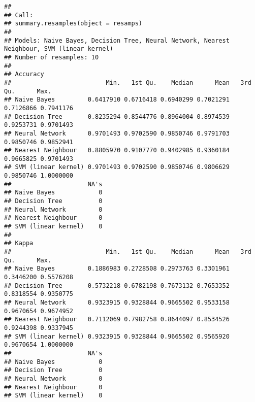 \documentclass[]{article}
\begin{document}
\begin{verbatim}
## 
## Call:
## summary.resamples(object = resamps)
## 
## Models: Naive Bayes, Decision Tree, Neural Network, Nearest Neighbour, SVM (linear kernel) 
## Number of resamples: 10 
## 
## Accuracy 
##                          Min.   1st Qu.    Median      Mean   3rd Qu.      Max.
## Naive Bayes         0.6417910 0.6716418 0.6940299 0.7021291 0.7126866 0.7941176
## Decision Tree       0.8235294 0.8544776 0.8964004 0.8974539 0.9253731 0.9701493
## Neural Network      0.9701493 0.9702590 0.9850746 0.9791703 0.9850746 0.9852941
## Nearest Neighbour   0.8805970 0.9107770 0.9402985 0.9360184 0.9665825 0.9701493
## SVM (linear kernel) 0.9701493 0.9702590 0.9850746 0.9806629 0.9850746 1.0000000
##                     NA's
## Naive Bayes            0
## Decision Tree          0
## Neural Network         0
## Nearest Neighbour      0
## SVM (linear kernel)    0
## 
## Kappa 
##                          Min.   1st Qu.    Median      Mean   3rd Qu.      Max.
## Naive Bayes         0.1886983 0.2728508 0.2973763 0.3301961 0.3446200 0.5576208
## Decision Tree       0.5732218 0.6782198 0.7673132 0.7653352 0.8318554 0.9350775
## Neural Network      0.9323915 0.9328844 0.9665502 0.9533158 0.9670654 0.9674952
## Nearest Neighbour   0.7112069 0.7982758 0.8644097 0.8534526 0.9244398 0.9337945
## SVM (linear kernel) 0.9323915 0.9328844 0.9665502 0.9565920 0.9670654 1.0000000
##                     NA's
## Naive Bayes            0
## Decision Tree          0
## Neural Network         0
## Nearest Neighbour      0
## SVM (linear kernel)    0
\end{verbatim}
\end{document}
